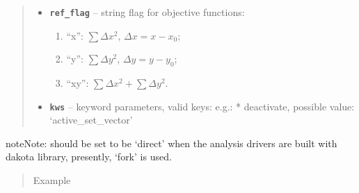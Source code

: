 \documentclass[letterpaper,10pt,english]{sphinxmanual}
\begin{document}
\begin{fulllineitems}
\begin{quote}
\begin{description}
\begin{itemize}
\item {} 
\textbf{\texttt{ref\_flag}} -- 
string flag for objective functions:
\begin{enumerate}
\item {} 
``x'': \(\sum \Delta x^2\), \(\Delta x = x-x_0\);

\item {} 
``y'': \(\sum \Delta y^2\), \(\Delta y = y-y_0\);

\item {} 
``xy'': \(\sum \Delta x^2 + \sum \Delta y^2\).

\end{enumerate}


\item {} 
\textbf{\texttt{kws}} -- keyword parameters, valid keys: 
e.g.:
* deactivate, possible value: `active\_set\_vector'

\end{itemize}

\end{description}\end{quote}

\begin{notice}{note}{Note:}
 should be set to be `direct' when the analysis drivers are
built with dakota library, presently, `fork' is used.
\end{notice}
\begin{quote}\begin{description}
\item[{Example}] \leavevmode
\end{description}\end{quote}


\end{fulllineitems}
\end{document}
